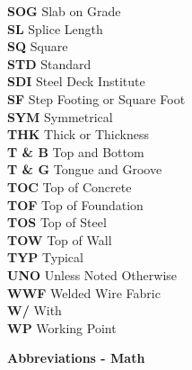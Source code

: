 \documentclass[12pt,notitle,letterpaper]{report}
\begin{document}
\begin{tabbing}
    \indent\textbf{SOG}      \>  {Slab on Grade}\\
    \indent\textbf{SL}       \>  {Splice Length}\\
    \indent\textbf{SQ}       \>  {Square}\\
    \indent\textbf{STD}      \>  {Standard}\\
    \indent\textbf{SDI}      \>  {Steel Deck Institute}\\
    \indent\textbf{SF}       \>  {Step Footing or Square Foot}\\
    \indent\textbf{SYM}      \>  {Symmetrical}\\
    \indent\textbf{THK}      \>  {Thick or Thickness}\\
    \indent\textbf{T \& B}   \>  {Top and Bottom}\\
    \indent\textbf{T \& G}   \>  {Tongue and Groove}\\
    \indent\textbf{TOC}      \>  {Top of Concrete}\\
    \indent\textbf{TOF}      \>  {Top of Foundation}\\
    \indent\textbf{TOS}      \>  {Top of Steel}\\
    \indent\textbf{TOW}      \>  {Top of Wall}\\
    \indent\textbf{TYP}      \>  {Typical}\\
    \indent\textbf{UNO}      \>  {Unless Noted Otherwise}\\
    \indent\textbf{WWF}      \>  {Welded Wire Fabric}\\
    \indent\textbf{W/}       \>  {With}\\
    \indent\textbf{WP}       \>  {Working Point}\\
\end{tabbing}

\begin{center} \textbf{Abbreviations - Math } \end{center}
\end{document}
